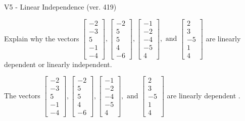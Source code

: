\begin{exercise}
  \begin{exerciseTitle}V5 - Linear Independence (ver. 419)\end{exerciseTitle}
  \begin{exerciseStatement}
    Explain why the vectors \(\left[\begin{array}{r}
-2 \\
-3 \\
5 \\
-1 \\
-4
\end{array}\right] , \left[\begin{array}{r}
-2 \\
5 \\
5 \\
4 \\
-6
\end{array}\right] , \left[\begin{array}{r}
-1 \\
-2 \\
-4 \\
-5 \\
4
\end{array}\right] , \text{ and } \left[\begin{array}{r}
2 \\
3 \\
-5 \\
1 \\
4
\end{array}\right]\) are linearly dependent or linearly independent.	


  \end{exerciseStatement}
  \begin{exerciseAnswer}
   The vectors \(\left[\begin{array}{r}
-2 \\
-3 \\
5 \\
-1 \\
-4
\end{array}\right] , \left[\begin{array}{r}
-2 \\
5 \\
5 \\
4 \\
-6
\end{array}\right] , \left[\begin{array}{r}
-1 \\
-2 \\
-4 \\
-5 \\
4
\end{array}\right] , \text{ and } \left[\begin{array}{r}
2 \\
3 \\
-5 \\
1 \\
4
\end{array}\right]\) are 
  	 linearly dependent  .
  


  \end{exerciseAnswer}
\end{exercise}